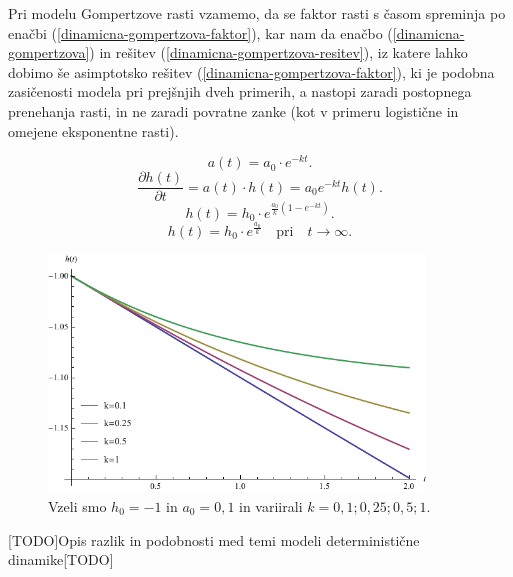 \documentclass[a4paper, twoside, 12pt]{book}
\begin{document}
    Pri modelu Gompertzove rasti vzamemo, da se faktor rasti s časom spreminja po enačbi (\ref{dinamicna-gompertzova-faktor}), kar nam da enačbo (\ref{dinamicna-gompertzova}) in rešitev (\ref{dinamicna-gompertzova-resitev}), iz katere lahko dobimo še asimptotsko rešitev (\ref{dinamicna-gompertzova-faktor}), ki je podobna zasičenosti modela pri prejšnjih dveh primerih, a nastopi zaradi postopnega prenehanja rasti, in ne zaradi povratne zanke (kot v primeru logistične in omejene eksponentne rasti).

    \begin{equation}
      a(t) = a_0 \cdot e^{- k t}.
      \label{dinamicna-gompertzova-faktor}
    \end{equation}
    \begin{equation}
      \frac{\partial h(t)}{\partial t} = a(t) \cdot h(t) = a_0 e^{ -k t} h(t).
      \label{dinamicna-gompertzova}
    \end{equation}
    \begin{equation}
      h(t) = h_0 \cdot e^{\frac{a_0}{k}(1-e^{-kt})}.
      \label{dinamicna-gompertzova-resitev}
    \end{equation}
    \begin{equation}
      h(t) = h_0 \cdot e^{\frac{a_0}{k}} \quad \text{pri} \quad t \rightarrow \infty.
      \label{dinamicna-gompertzova-limita}
    \end{equation}

    \begin{figure}[h!]
      \begin{center}
        \includegraphics[width=10cm]{slike/gompertzova-rast}
      \end{center}
      \caption{Vzeli smo $h_0=-1$ in $a_0=0,1$ in variirali $k=0,1;0,25;0,5;1$.}
      \label{fig:gompertzova-rast}
    \end{figure}
[TODO]Opis razlik in podobnosti med temi modeli deterministične dinamike[TODO]
\end{document}
